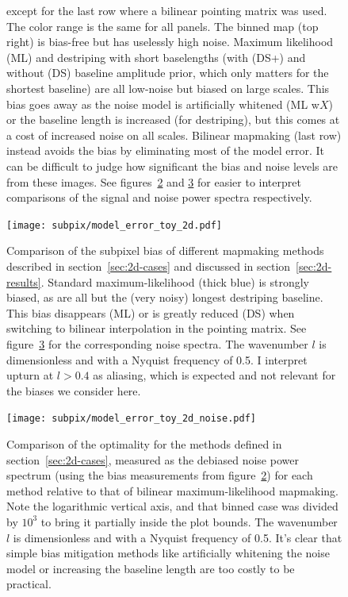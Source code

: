 \documentclass[twocolumn,apj]{aastex63}
\begin{document}
\begin{figure}[p]
{		except for the last row where a bilinear pointing matrix was used.
		The color range is the same for all panels.
		The binned map (top right) is bias-free but has uselessly high noise. Maximum likelihood (ML)
		and destriping with short baselengths (with (DS+) and without (DS) baseline amplitude prior,
		which only matters for the shortest baseline)
		are all low-noise but biased on large scales. This bias goes away as the noise model
		is artificially whitened (ML w$X$) or the baseline length is increased (for destriping),
		but this comes at a cost of increased noise on all scales.
		Bilinear mapmaking (last row) instead avoids the bias by eliminating most of the model error.
		It can be difficult to judge how significant the bias and noise levels are from
		these images. See figures~\ref{fig:2d-bias} and \ref{fig:2d-noise} for easier to
		interpret comparisons of the signal and noise power spectra respectively.
	}
	\label{fig:2d-maps}
\end{figure}

\begin{figure}
	\centering
	\hspace*{-5mm}\texttt{[image: subpix/model\_error\_toy\_2d.pdf]}
	\caption{
		Comparison of the subpixel bias of different mapmaking methods
		described in section~\ref{sec:2d-cases} and discussed in section~\ref{sec:2d-results}.
		Standard maximum-likelihood (thick blue) is strongly biased, as are all but
		the (very noisy) longest destriping baseline. This bias disappears (ML)
		or is greatly reduced (DS) when switching to bilinear interpolation in the pointing matrix.
		See figure~\ref{fig:2d-noise} for the corresponding noise spectra.
		The wavenumber $l$ is dimensionless and with a Nyquist frequency of 0.5.
		I interpret upturn at $l>0.4$ as aliasing, which
		is expected and not relevant for the biases we consider here.
	}
	\label{fig:2d-bias}
\end{figure}

\begin{figure}[h!]
	\centering
	\hspace*{-5mm}\texttt{[image: subpix/model\_error\_toy\_2d\_noise.pdf]}
	\caption{
		Comparison of the optimality for the methods defined in section~\ref{sec:2d-cases}, measured
		as the debiased noise power spectrum (using the bias measurements from figure~\ref{fig:2d-bias})
		for each method relative to that of bilinear maximum-likelihood mapmaking.
		Note the logarithmic vertical axis, and that binned case was divided by $10^3$
		to bring it partially inside the plot bounds.
		The wavenumber $l$ is dimensionless and with a Nyquist frequency of 0.5.
		It's clear that simple bias mitigation
		methods like artificially whitening the noise model or increasing the
		baseline length are too costly to be practical.
	}
	\label{fig:2d-noise}
\end{figure}
\end{document}
